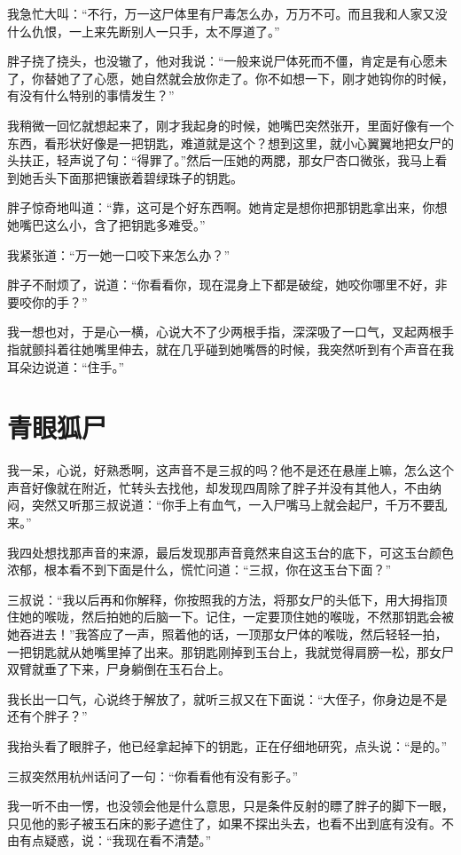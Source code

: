 我急忙大叫：“不行，万一这尸体里有尸毒怎么办，万万不可。而且我和人家又没什么仇恨，一上来先断别人一只手，太不厚道了。”

胖子挠了挠头，也没辙了，他对我说：“一般来说尸体死而不僵，肯定是有心愿未了，你替她了了心愿，她自然就会放你走了。你不如想一下，刚才她钩你的时候，有没有什么特别的事情发生？”

我稍微一回忆就想起来了，刚才我起身的时候，她嘴巴突然张开，里面好像有一个东西，看形状好像是一把钥匙，难道就是这个？想到这里，就小心翼翼地把女尸的头扶正，轻声说了句：“得罪了。”然后一压她的两腮，那女尸杏口微张，我马上看到她舌头下面那把镶嵌着碧绿珠子的钥匙。

胖子惊奇地叫道：“靠，这可是个好东西啊。她肯定是想你把那钥匙拿出来，你想她嘴巴这么小，含了把钥匙多难受。”

我紧张道：“万一她一口咬下来怎么办？”

胖子不耐烦了，说道：“你看看你，现在混身上下都是破绽，她咬你哪里不好，非要咬你的手？”

我一想也对，于是心一横，心说大不了少两根手指，深深吸了一口气，叉起两根手指就颤抖着往她嘴里伸去，就在几乎碰到她嘴唇的时候，我突然听到有个声音在我耳朵边说道：“住手。”

\chapter{青眼狐尸}

我一呆，心说，好熟悉啊，这声音不是三叔的吗？他不是还在悬崖上嘛，怎么这个声音好像就在附近，忙转头去找他，却发现四周除了胖子并没有其他人，不由纳闷，突然又听那三叔说道：“你手上有血气，一入尸嘴马上就会起尸，千万不要乱来。”

我四处想找那声音的来源，最后发现那声音竟然来自这玉台的底下，可这玉台颜色浓郁，根本看不到下面是什么，慌忙问道：“三叔，你在这玉台下面？”

三叔说：“我以后再和你解释，你按照我的方法，将那女尸的头低下，用大拇指顶住她的喉咙，然后拍她的后脑一下。记住，一定要顶住她的喉咙，不然那钥匙会被她吞进去！”我答应了一声，照着他的话，一顶那女尸体的喉咙，然后轻轻一拍，一把钥匙就从她嘴里掉了出来。那钥匙刚掉到玉台上，我就觉得肩膀一松，那女尸双臂就垂了下来，尸身躺倒在玉石台上。

我长出一口气，心说终于解放了，就听三叔又在下面说：“大侄子，你身边是不是还有个胖子？”

我抬头看了眼胖子，他已经拿起掉下的钥匙，正在仔细地研究，点头说：“是的。”

三叔突然用杭州话问了一句：“你看看他有没有影子。”

我一听不由一愣，也没领会他是什么意思，只是条件反射的瞟了胖子的脚下一眼，只见他的影子被玉石床的影子遮住了，如果不探出头去，也看不出到底有没有。不由有点疑惑，说：“我现在看不清楚。”

